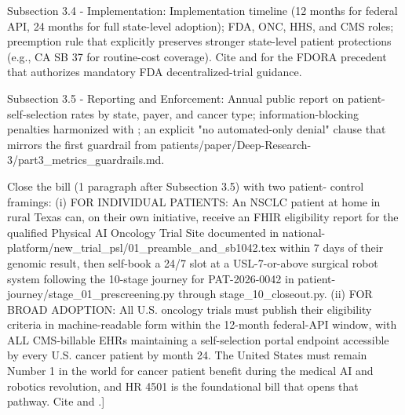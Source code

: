 Subsection 3.4 - Implementation: Implementation timeline (12 months
for federal API, 24 months for full state-level adoption); FDA, ONC,
HHS, and CMS roles; preemption rule that explicitly preserves stronger
state-level patient protections (e.g., CA SB 37 for routine-cost
coverage). Cite \cite{rank8_california_sb37_2001} and
\cite{rank4_fdora_fda_modernization_2022} for the FDORA precedent
that authorizes mandatory FDA decentralized-trial guidance.

Subsection 3.5 - Reporting and Enforcement: Annual public report on
patient-self-selection rates by state, payer, and cancer type;
information-blocking penalties harmonized with
\cite{federal_register_info_blocking_disincentives_2024}; an explicit
"no automated-only denial" clause that mirrors the first guardrail
from patients/paper/Deep-Research-3/part3\_metrics\_guardrails.md.

Close the bill (1 paragraph after Subsection 3.5) with two patient-
control framings:
(i) FOR INDIVIDUAL PATIENTS: An NSCLC patient at home in rural Texas
    can, on their own initiative, receive an FHIR eligibility report
    for the qualified Physical AI Oncology Trial Site documented in
    national-platform/new\_trial\_psl/01\_preamble\_and\_sb1042.tex within
    7 days of their genomic result, then self-book a 24/7 slot at a
    USL-7-or-above surgical robot system following the 10-stage
    journey for PAT-2026-0042 in
    patient-journey/stage\_01\_prescreening.py through
    stage\_10\_closeout.py.
(ii) FOR BROAD ADOPTION: All U.S. oncology trials must publish their
     eligibility criteria in machine-readable form within the
     12-month federal-API window, with ALL CMS-billable EHRs
     maintaining a self-selection portal endpoint accessible by every
     U.S. cancer patient by month 24. The United States must remain
     Number 1 in the world for cancer patient benefit during the
     medical AI and robotics revolution, and HR 4501 is the
     foundational bill that opens that pathway. Cite
     \cite{kawchak_2026_19994945} and \cite{kawchak_2026_19119939}.]
